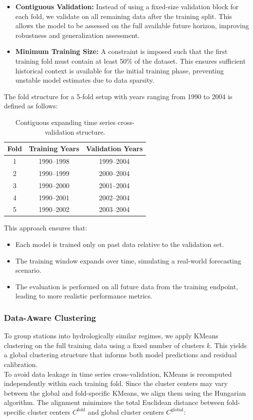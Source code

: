 \documentclass[a4paper,12pt]{article}
\begin{document}
\begin{itemize}
    \item \textbf{Contiguous Validation:} Instead of using a fixed-size validation block for each fold, we validate on all remaining data after the training split. This allows the model to be assessed on the full available future horizon, improving robustness and generalization assessment.
    
    \item \textbf{Minimum Training Size:} A constraint is imposed such that the first training fold must contain at least 50\% of the dataset. This ensures sufficient historical context is available for the initial training phase, preventing unstable model estimates due to data sparsity.
\end{itemize}

The fold structure for a 5-fold setup with years ranging from 1990 to 2004 is defined as follows:

\begin{table}[h!]
\centering
\begin{tabular}{|c|c|c|}
\hline
\textbf{Fold} & \textbf{Training Years} & \textbf{Validation Years} \\
\hline
1 & 1990--1998 & 1999--2004 \\
2 & 1990--1999 & 2000--2004 \\
3 & 1990--2000 & 2001--2004 \\
4 & 1990--2001 & 2002--2004 \\
5 & 1990--2002 & 2003--2004 \\
\hline
\end{tabular}
\caption{Contiguous expanding time series cross-validation structure.}
\end{table}

This approach ensures that:
\begin{itemize}
    \item Each model is trained only on past data relative to the validation set.
    \item The training window expands over time, simulating a real-world forecasting scenario.
    \item The evaluation is performed on all future data from the training endpoint, leading to more realistic performance metrics.
\end{itemize}

\subsubsection{Data-Aware Clustering}
To group stations into hydrologically similar regimes, we apply KMeans clustering on the full training data using a 
fixed number of clusters \( k \). This yields a global clustering structure that informs both model predictions and 
residual calibration.\\
To avoid data leakage in time series cross-validation, KMeans is recomputed independently within each training fold. 
Since the cluster centers may vary between the global and fold-specific KMeans, we align them using the Hungarian 
algorithm. The alignment minimizes the total Euclidean distance between fold-specific cluster centers 
\( C^{\text{fold}} \) and global cluster centers \( C^{\text{global}} \):
\end{document}
